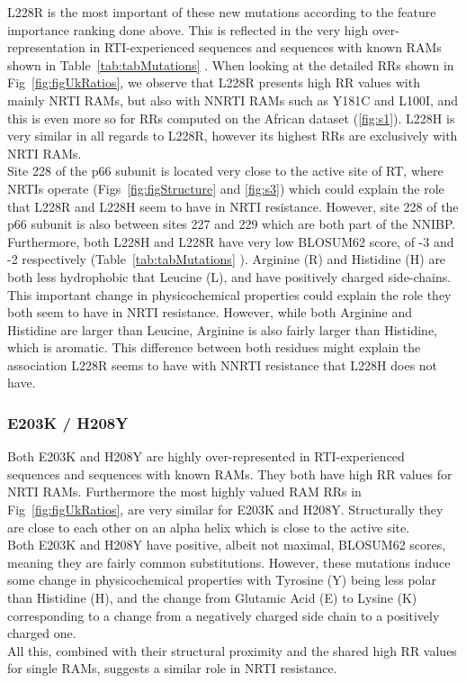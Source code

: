 \documentclass[
  11,
]{scrbook}
\begin{document}
L228R is the most important of these new mutations according to the
feature importance ranking done above. This is reflected in the very
high over-representation in RTI-experienced sequences and sequences with
known RAMs shown in Table~\ref{tab:tabMutations}
. When looking at the detailed RRs shown in
Fig~\ref{fig:figUkRatios}, we
observe that L228R presents high RR values with mainly NRTI RAMs, but
also with NNRTI RAMs such as Y181C and L100I, and this is even more so
for RRs computed on the African dataset (\ref{fig:s1}). L228H is very similar in all
regards to L228R, however its highest RRs are exclusively with NRTI
RAMs.\\
Site 228 of the p66 subunit is located very close to the active site of
RT, where NRTIs operate (Figs~\ref{fig:figStructure} and \ref{fig:s3}) which could explain the role that L228R
and L228H seem to have in NRTI resistance. However, site 228 of the p66
subunit is also between sites 227 and 229 which are both part of the
NNIBP. Furthermore, both L228H and L228R have very low BLOSUM62 score,
of -3 and -2 respectively (Table~\ref{tab:tabMutations}
). Arginine (R) and Histidine (H) are both less
hydrophobic that Leucine (L), and have positively charged side-chains.
This important change in physicochemical properties could explain the
role they both seem to have in NRTI resistance. However, while both
Arginine and Histidine are larger than Leucine, Arginine is also fairly
larger than Histidine, which is aromatic. This difference between both
residues might explain the association L228R seems to have with NNRTI
resistance that L228H does not have.

\hypertarget{e203k-h208y}{%
\subsubsection{E203K / H208Y}\label{e203k-h208y}}

Both E203K and H208Y are highly over-represented in RTI-experienced
sequences and sequences with known RAMs. They both have high RR values
for NRTI RAMs. Furthermore the most highly valued RAM RRs in
Fig~\ref{fig:figUkRatios}, are
very similar for E203K and H208Y. Structurally they are close to each
other on an alpha helix which is close to the active site.\\
Both E203K and H208Y have positive, albeit not maximal, BLOSUM62 scores,
meaning they are fairly common substitutions. However, these mutations
induce some change in physicochemical properties with Tyrosine (Y) being
less polar than Histidine (H), and the change from Glutamic Acid (E) to
Lysine (K) corresponding to a change from a negatively charged side
chain to a positively charged one.\\
All this, combined with their structural proximity and the shared high
RR values for single RAMs, suggests a similar role in NRTI resistance.
\end{document}
